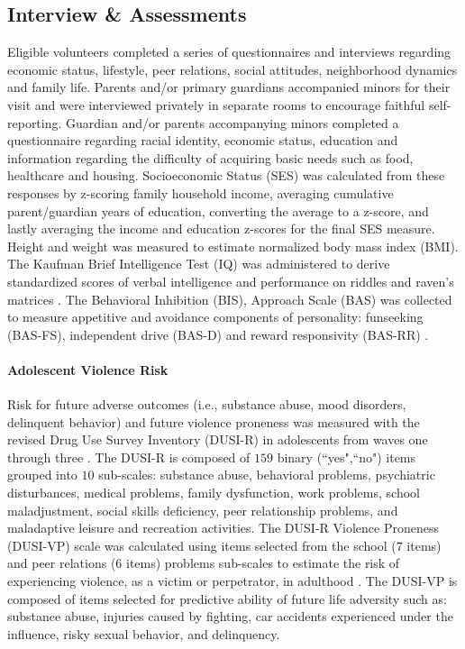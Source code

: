 \documentclass[utf8]{article}
\begin{document}
\subsection*{Interview \& Assessments}
Eligible volunteers completed a series of questionnaires and interviews regarding economic status, lifestyle, peer relations, social attitudes, neighborhood dynamics and family life. Parents and/or primary guardians accompanied minors for their visit and were interviewed privately in separate rooms to encourage faithful self-reporting. Guardian and/or parents accompanying minors completed a questionnaire regarding racial identity, economic status, education and information regarding the difficulty of acquiring basic needs such as food, healthcare and housing. Socioeconomic Status (SES) was calculated from these responses by z-scoring family household income, averaging cumulative parent/guardian years of education, converting the average to a z-score, and lastly averaging the income and education z-scores for the final SES measure. Height and weight was measured to estimate normalized body mass index (BMI). The Kaufman Brief Intelligence Test (IQ) was administered to derive standardized scores of verbal intelligence and performance on riddles and raven’s matrices \citep{kaufman2004kaufman}. The Behavioral Inhibition (BIS), Approach Scale (BAS) was collected to measure appetitive and avoidance components of personality:  funseeking (BAS-FS), independent drive (BAS-D) and reward responsivity (BAS-RR) \citep{carver1994behavioral}.
\paragraph{Adolescent Violence Risk} 
Risk for future adverse outcomes (i.e., substance abuse, mood disorders, delinquent behavior) and future violence proneness was measured with the revised Drug Use Survey Inventory (DUSI-R) in adolescents from waves one through three  \citep*{tarter1994reliability}. The DUSI-R is composed of $159$ binary (``yes",``no") items grouped into $10$ sub-scales: substance abuse, behavioral problems, psychiatric disturbances, medical problems, family dysfunction, work problems, school maladjustment, social skills deficiency, peer relationship problems, and maladaptive leisure and recreation activities. The DUSI-R Violence Proneness (DUSI-VP) scale was calculated using items selected from the school ($7$ items) and peer relations ($6$ items) problems sub-scales to estimate the risk of experiencing violence, as a victim or perpetrator, in adulthood \citep*{kirisci2009violence}. The DUSI-VP is composed of items selected for predictive ability of future life adversity such as: substance abuse, injuries caused by fighting, car accidents experienced under the influence, risky sexual behavior, and delinquency.
\end{document}
